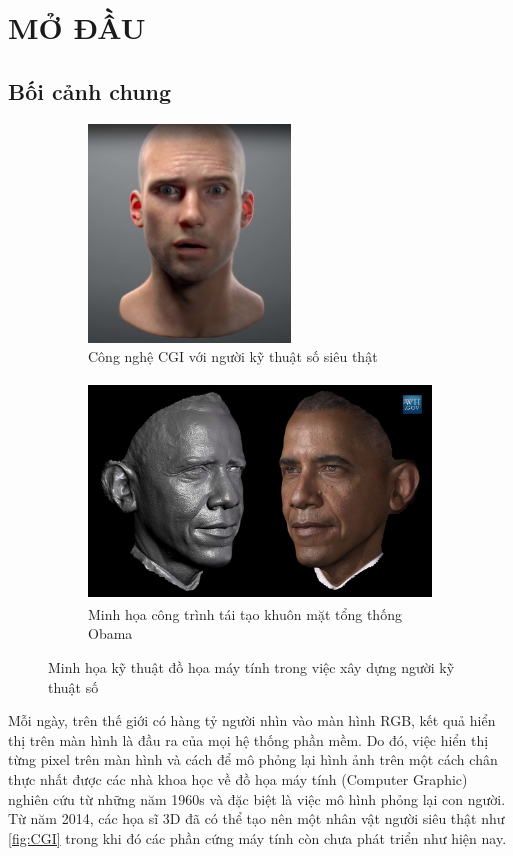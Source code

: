 
\chapter{MỞ ĐẦU}
\label{Introduction}

\section{Bối cảnh chung}


\begin{figure}[htbp]
	\centering
	\begin{subfigure}{0.35\textwidth}
		\centering
		\includegraphics[height=5.8cm]{images/cgi}
		 \caption{\small Công nghệ CGI với người kỹ thuật số siêu thật \cite{edchrisjones}}
		\label{fig:CGI}
	\end{subfigure}
	\hfill
	\begin{subfigure}{0.6\textwidth}
		\centering
		\includegraphics[height=5.8cm]{images/obama_scan}
		\caption{\small Minh họa công trình tái tạo khuôn mặt tổng thống Obama \cite{metallo2015scanning}}
		\label{fig:obamascan}
	\end{subfigure}
	\caption{Minh họa kỹ thuật đồ họa máy tính trong việc xây dựng người kỹ thuật số}
	\label{fig:DigitalHuman}
\end{figure}

Mỗi ngày, trên thế giới có hàng tỷ người nhìn vào màn hình RGB, kết quả hiển thị trên màn hình là đầu ra của mọi hệ thống phần mềm. Do đó, việc hiển thị từng pixel trên màn hình và cách để mô phỏng lại hình ảnh trên một cách chân thực nhất được các nhà khoa học về đồ họa máy tính (Computer Graphic) nghiên cứu từ những năm 1960s và đặc biệt là việc mô hình phỏng lại con người. Từ năm 2014, các họa sĩ 3D đã có thể tạo nên một nhân vật người siêu thật như \autoref{fig:CGI} trong khi đó các phần cứng máy tính còn chưa phát triển như hiện nay. 

